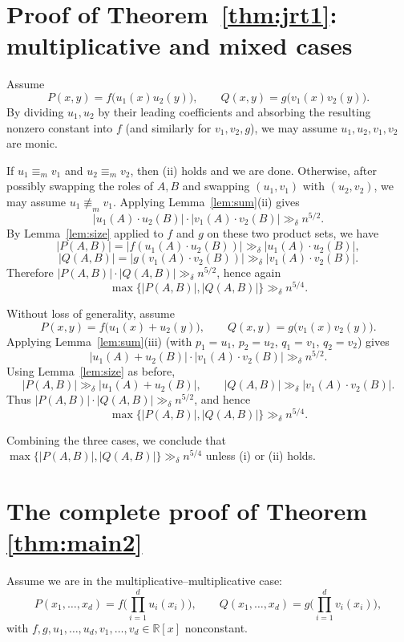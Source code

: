 \documentclass[12pt,reqno]{amsart}
\numberwithin{equation}{section}
\begin{document}
\section{Proof of Theorem~\ref{thm:jrt1}: multiplicative and mixed cases}\label{app:jrt-cases}
\medskip
{}
Assume
\[
P(x,y)=f\big(u_1(x)u_2(y)\big),\qquad Q(x,y)=g\big(v_1(x)v_2(y)\big).
\]
By dividing $u_1,u_2$ by their leading coefficients and absorbing the resulting nonzero constant into $f$
(and similarly for $v_1,v_2,g$), we may assume $u_1,u_2,v_1,v_2$ are monic.

If $u_1\equiv_m v_1$ and $u_2\equiv_m v_2$, then (ii) holds and we are done.
Otherwise, after possibly swapping the roles of $A,B$ and swapping $(u_1,v_1)$ with $(u_2,v_2)$,
we may assume $u_1\not\equiv_m v_1$.
Applying Lemma~\ref{lem:sum}(ii) gives
\[
|u_1(A)\cdot u_2(B)|\cdot |v_1(A)\cdot v_2(B)|\gg_{\delta} n^{5/2}.
\]
By Lemma~\ref{lem:size} applied to $f$ and $g$ on these two product sets, we have
\[
|P(A,B)|=|f(u_1(A)\cdot u_2(B))|\gg_{\delta} |u_1(A)\cdot u_2(B)|,
\]
\[
|Q(A,B)|=|g(v_1(A)\cdot v_2(B))|\gg_{\delta} |v_1(A)\cdot v_2(B)|.
\]
Therefore $|P(A,B)|\cdot |Q(A,B)|\gg_{\delta} n^{5/2}$, hence again
\[
\max\{|P(A,B)|,|Q(A,B)|\}\gg_{\delta} n^{5/4}.
\]

\medskip
{}
Without loss of generality, assume
\[
P(x,y)=f\big(u_1(x)+u_2(y)\big),\qquad Q(x,y)=g\big(v_1(x)v_2(y)\big).
\]
Applying Lemma~\ref{lem:sum}(iii) (with $p_1=u_1$, $p_2=u_2$, $q_1=v_1$, $q_2=v_2$) gives
\[
|u_1(A)+u_2(B)|\cdot |v_1(A)\cdot v_2(B)|\gg_{\delta} n^{5/2}.
\]
Using Lemma~\ref{lem:size} as before,
\[
|P(A,B)|\gg_{\delta} |u_1(A)+u_2(B)|,\qquad |Q(A,B)|\gg_{\delta} |v_1(A)\cdot v_2(B)|.
\]
Thus $|P(A,B)|\cdot |Q(A,B)|\gg_{\delta} n^{5/2}$, and hence
\[
\max\{|P(A,B)|,|Q(A,B)|\}\gg_{\delta} n^{5/4}.
\]

\medskip
Combining the three cases, we conclude that
$\max\{|P(A,B)|,|Q(A,B)|\}\gg_{\delta} n^{5/4}$
unless (i) or (ii) holds.



\section{The complete proof of Theorem \ref{thm:main2}}\label{app:mm}

\smallskip
{}
Assume we are in the multiplicative--multiplicative case:
\[
P(x_{1},\ldots,x_{d})=f\!\Big(\prod_{i=1}^{d}u_{i}(x_{i})\Big),
\qquad
Q(x_{1},\ldots,x_{d})=g\!\Big(\prod_{i=1}^{d}v_{i}(x_{i})\Big),
\]
with $f,g,u_{1},\ldots,u_{d},v_{1},\ldots,v_{d}\in\mathbb R[x]$ nonconstant.
\end{document}
